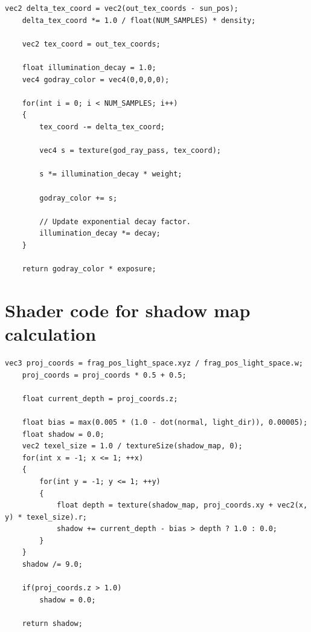 \documentclass{article}
\begin{document}
	\begin{lstlisting}[basicstyle=\ttfamily\footnotesize, tabsize=4]
	vec2 delta_tex_coord = vec2(out_tex_coords - sun_pos);
	delta_tex_coord *= 1.0 / float(NUM_SAMPLES) * density;
	
	vec2 tex_coord = out_tex_coords;
	
	float illumination_decay = 1.0;
	vec4 godray_color = vec4(0,0,0,0);
	
	for(int i = 0; i < NUM_SAMPLES; i++)
	{
		tex_coord -= delta_tex_coord;
		
		vec4 s = texture(god_ray_pass, tex_coord);
		
		s *= illumination_decay * weight;
		
		godray_color += s;
		
		// Update exponential decay factor.
		illumination_decay *= decay;
	}
	
	return godray_color * exposure;
	\end{lstlisting}
		
	\section{Shader code for shadow map calculation}
	\label{appendix:shadow}
		
	\begin{lstlisting}[basicstyle=\ttfamily\footnotesize, tabsize=4]
	vec3 proj_coords = frag_pos_light_space.xyz / frag_pos_light_space.w;
	proj_coords = proj_coords * 0.5 + 0.5;

	float current_depth = proj_coords.z;
	
	float bias = max(0.005 * (1.0 - dot(normal, light_dir)), 0.00005);
	float shadow = 0.0;
	vec2 texel_size = 1.0 / textureSize(shadow_map, 0);
	for(int x = -1; x <= 1; ++x)
	{
		for(int y = -1; y <= 1; ++y)
		{
			float depth = texture(shadow_map, proj_coords.xy + vec2(x, y) * texel_size).r; 
			shadow += current_depth - bias > depth ? 1.0 : 0.0;        
		}
	}
	shadow /= 9.0;
	
	if(proj_coords.z > 1.0)
		shadow = 0.0;
	
	return shadow;
		
	\end{lstlisting}
  	
\end{document}
